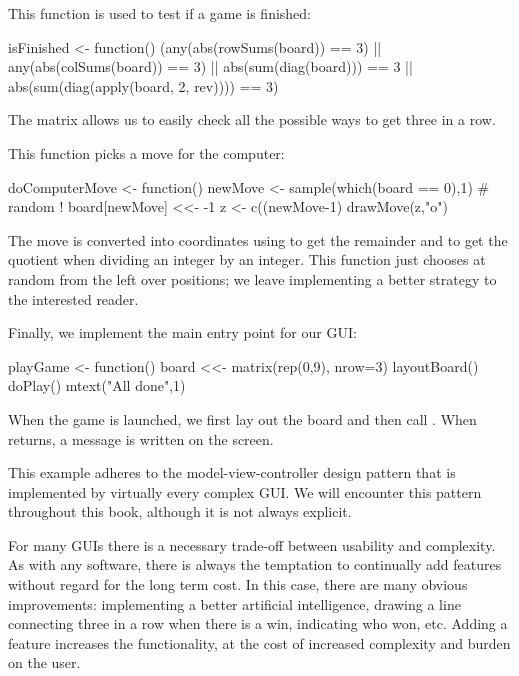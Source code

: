 This function is used to test if a game is finished:
\begin{Schunk}
\begin{Sinput}
 isFinished <- function() {
   (any(abs(rowSums(board)) == 3) || 
    any(abs(colSums(board)) == 3) || 
    abs(sum(diag(board))) == 3 || 
    abs(sum(diag(apply(board, 2, rev)))) == 3)
 }
\end{Sinput}
\end{Schunk}
%
The matrix  allows us to easily check all the possible ways
to get three in a row.

This function picks a move for the computer:
\begin{Schunk}
\begin{Sinput}
 doComputerMove <- function() {
   newMove <- sample(which(board == 0),1) # random !
   board[newMove] <<- -1    
   z <- c((newMove-1) %
   drawMove(z,"o")
 }
\end{Sinput}
\end{Schunk}
%
The move is converted into coordinates using \code{\%\%} to get the
remainder and \code{\%/\%} to get the quotient when dividing an
integer by an integer. This function just chooses at random from the
left over positions; we leave implementing a better strategy to the
interested reader.

Finally, we implement the main entry point for our GUI:
\begin{Schunk}
\begin{Sinput}
 playGame <- function() {
   board <<- matrix(rep(0,9), nrow=3)  
   layoutBoard()
   doPlay()
   mtext("All done\n",1)
 }
\end{Sinput}
\end{Schunk}
%
When the game is launched, we first lay out the board and then call
. When  returns, a message is written
on the screen.

This example adheres to the model-view-controller design pattern that
is implemented by virtually every complex GUI. We will encounter this
pattern throughout this book, although it is not always explicit.

For many GUIs there is a necessary trade-off between usability and
complexity. As with any software, there is always the temptation to
continually add features without regard for the long term cost. In
this case, there are many obvious improvements: implementing a better
artificial intelligence, drawing a line connecting three in a row when
there is a win, indicating who won, etc. Adding a feature increases
the functionality, at the cost of increased complexity and burden on
the user.

